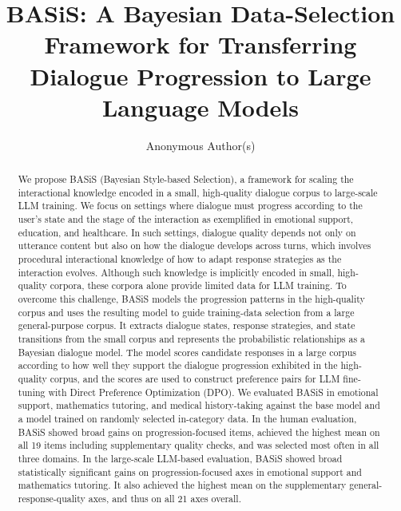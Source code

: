 \documentclass[manuscript,review,anonymous]{acmart}
\begin{document}
\title{BASiS: A Bayesian Data-Selection Framework for Transferring Dialogue Progression to Large Language Models}

\author{Anonymous Author(s)}
\renewcommand{\shortauthors}{Anonymous Author(s)}

\begin{abstract}
We propose BASiS (Bayesian Style-based Selection), a framework for scaling the interactional knowledge encoded in a small, high-quality dialogue corpus to large-scale LLM training. We focus on settings where dialogue must progress according to the user’s state and the stage of the interaction as exemplified in emotional support, education, and healthcare. In such settings, dialogue quality depends not only on utterance content but also on how the dialogue develops across turns, which involves procedural interactional knowledge of how to adapt response strategies as the interaction evolves. Although such knowledge is implicitly encoded in small, high-quality corpora, these corpora alone provide limited data for LLM training. To overcome this challenge, BASiS models the progression patterns in the high-quality corpus and uses the resulting model to guide training-data selection from a large general-purpose corpus. It extracts dialogue states, response strategies, and state transitions from the small corpus and represents the probabilistic relationships as a Bayesian dialogue model. The model scores candidate responses in a large corpus according to how well they support the dialogue progression exhibited in the high-quality corpus, and the scores are used to construct preference pairs for LLM fine-tuning with Direct Preference Optimization (DPO).
We evaluated BASiS in emotional support, mathematics tutoring, and medical history-taking against the base model and a model trained on randomly selected in-category data. In the human evaluation, BASiS showed broad gains on progression-focused items, achieved the highest mean on all 19 items including supplementary quality checks, and was selected most often in all three domains. In the large-scale LLM-based evaluation, BASiS showed broad statistically significant gains on progression-focused axes in emotional support and mathematics tutoring. It also achieved the highest mean on the supplementary general-response-quality axes, and thus on all 21 axes overall.
\end{abstract}
\end{document}
